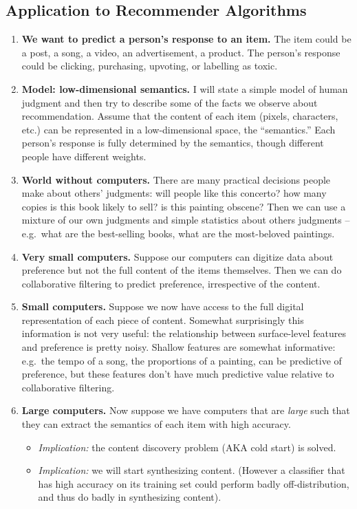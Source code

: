 \documentclass[
  10pt,
  letterpaper,
  DIV=11,
  numbers=noendperiod,
  oneside]{scrartcl}
\providecommand{\tightlist}{%
  \setlength{\itemsep}{0pt}\setlength{\parskip}{0pt}}\usepackage{longtable,booktabs,array}
\begin{document}
\subsection{Application to Recommender
Algorithms}\label{application-to-recommender-algorithms}

\begin{enumerate}
\def\labelenumi{\arabic{enumi}.}
\item
  \textbf{We want to predict a person's response to an item.} The item
  could be a post, a song, a video, an advertisement, a product. The
  person's response could be clicking, purchasing, upvoting, or
  labelling as toxic.
\item
  \textbf{Model: low-dimensional semantics.} I will state a simple model
  of human judgment and then try to describe some of the facts we
  observe about recommendation. Assume that the content of each item
  (pixels, characters, etc.) can be represented in a low-dimensional
  space, the ``semantics.'' Each person's response is fully determined
  by the semantics, though different people have different weights.
\item
  \textbf{World without computers.} There are many practical decisions
  people make about others' judgments: will people like this concerto?
  how many copies is this book likely to sell? is this painting obscene?
  Then we can use a mixture of our own judgments and simple statistics
  about others judgments -- e.g.~what are the best-selling books, what
  are the most-beloved paintings.
\item
  \textbf{Very small computers.} Suppose our computers can digitize data
  about preference but not the full content of the items themselves.
  Then we can do collaborative filtering to predict preference,
  irrespective of the content.
\item
  \textbf{Small computers.} Suppose we now have access to the full
  digital representation of each piece of content. Somewhat surprisingly
  this information is not very useful: the relationship between
  surface-level features and preference is pretty noisy. Shallow
  features are somewhat informative: e.g.~the tempo of a song, the
  proportions of a painting, can be predictive of preference, but these
  features don't have much predictive value relative to collaborative
  filtering.
\item
  \textbf{Large computers.} Now suppose we have computers that are
  \emph{large} such that they can extract the semantics of each item
  with high accuracy.

  \begin{itemize}
  \tightlist
  \item
    \emph{Implication:} the content discovery problem (AKA cold start)
    is solved.
  \item
    \emph{Implication:} we will start synthesizing content. (However a
    classifier that has high accuracy on its training set could perform
    badly off-distribution, and thus do badly in synthesizing content).
  \end{itemize}
\end{enumerate}
\end{document}
